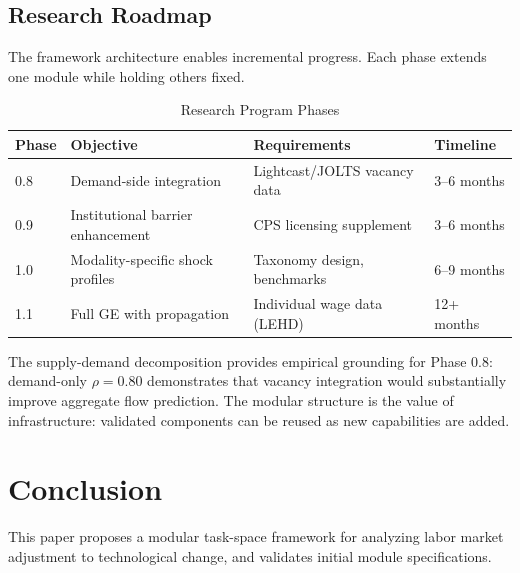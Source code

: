 \documentclass[12pt]{article}
\begin{document}
\subsection{Research Roadmap}
\label{subsec:roadmap}


The framework architecture enables incremental progress. Each phase extends one module while holding others fixed.


\begin{table}[h!]
\centering
\caption{Research Program Phases}
\label{tab:research-phases}
\begin{tabular}{llll}
\toprule
\textbf{Phase} & \textbf{Objective} & \textbf{Requirements} & \textbf{Timeline} \\
\midrule
0.8 & Demand-side integration & Lightcast/JOLTS vacancy data & 3--6 months \\
0.9 & Institutional barrier enhancement & CPS licensing supplement & 3--6 months \\
1.0 & Modality-specific shock profiles & Taxonomy design, benchmarks & 6--9 months \\
1.1 & Full GE with propagation & Individual wage data (LEHD) & 12+ months \\
\bottomrule
\end{tabular}
\end{table}


The supply-demand decomposition provides empirical grounding for Phase 0.8: demand-only $\rho = 0.80$ demonstrates that vacancy integration would substantially improve aggregate flow prediction. The modular structure is the value of infrastructure: validated components can be reused as new capabilities are added.


\section{Conclusion}
\label{sec:conclusion}


This paper proposes a modular task-space framework for analyzing labor market adjustment to technological change, and validates initial module specifications.
\end{document}
